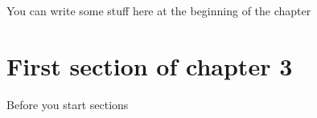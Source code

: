 You can write some stuff here at the beginning of the chapter


\section{First section of chapter 3}

Before you start sections
